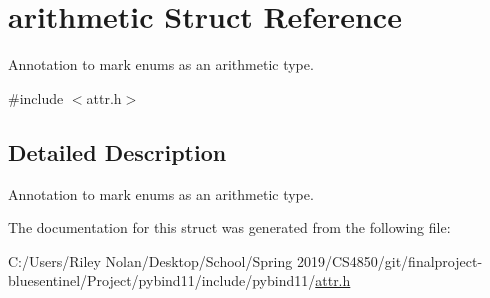 \hypertarget{structarithmetic}{}\section{arithmetic Struct Reference}
\label{structarithmetic}


Annotation to mark enums as an arithmetic type.  




{\ttfamily \#include $<$attr.\+h$>$}



\subsection{Detailed Description}
Annotation to mark enums as an arithmetic type. 

The documentation for this struct was generated from the following file\+:\begin{DoxyCompactItemize}
\item 
C\+:/\+Users/\+Riley Nolan/\+Desktop/\+School/\+Spring 2019/\+C\+S4850/git/finalproject-\/bluesentinel/\+Project/pybind11/include/pybind11/\mbox{\hyperlink{attr_8h}{attr.\+h}}\end{DoxyCompactItemize}
